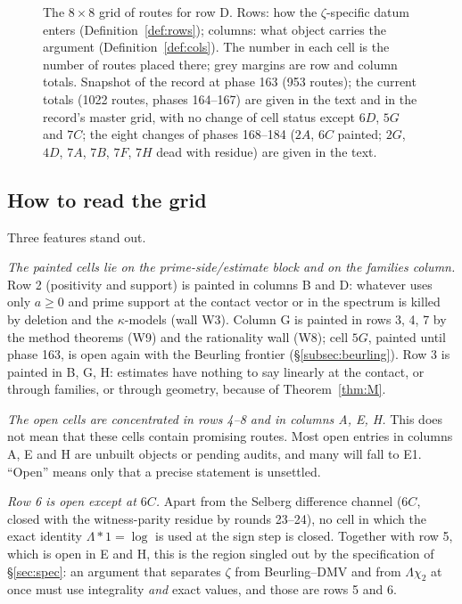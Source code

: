 \documentclass[11pt]{amsart}
\theoremstyle{definition}
\theoremstyle{remark}
\begin{document}
\begin{figure}[ht]
\begin{tikzpicture}[x=1.45cm,y=1.05cm,font=\small]
\end{tikzpicture}
\caption{The $8\times8$ grid of routes for row D. Rows: how the $\zeta$-specific datum enters
(Definition~\ref{def:rows}); columns: what object carries the argument (Definition~\ref{def:cols}).
The number in each cell is the number of routes placed there; grey margins are row and column totals. Snapshot of the record at phase 163 (953 routes); the current totals (1022 routes, phases 164--167) are given in the text and in the record's master grid, with no change of cell status except $6D$, $5G$ and $7C$; the eight changes of phases 168--184 ($2A$, $6C$ painted; $2G$, $4D$, $7A$, $7B$, $7F$, $7H$ dead with residue) are given in the text.}
\label{fig:grid}
\end{figure}

\subsection{How to read the grid}
Three features stand out.

\emph{The painted cells lie on the prime-side/estimate block and on the families column.} Row 2 (positivity
and support) is painted in columns B and D: whatever uses only $a\ge0$ and prime support at the contact
vector or in the spectrum is killed by deletion and the $\kappa$-models (wall W3). Column G is painted in
rows 3, 4, 7 by the method theorems (W9) and the rationality wall (W8); cell $5G$, painted until phase 163, is open again with the Beurling frontier (\S\ref{subsec:beurling}). Row 3 is painted in B, G, H:
estimates have nothing to say linearly at the contact, or through families, or through geometry,
because of Theorem~\ref{thm:M}.

\emph{The open cells are concentrated in rows 4--8 and in columns A, E, H.} This does not mean that these
cells contain promising routes. Most open entries in columns A, E and H are unbuilt objects or pending
audits, and many will fall to E1. ``Open'' means only that a precise statement is unsettled.

\emph{Row 6 is open except at $6C$.} Apart from the Selberg difference channel ($6C$, closed with the
witness-parity residue by rounds 23--24), no cell in which the exact identity $\Lambda*1=\log$ is used at
the sign step is closed. Together with row 5, which is open in E and H, this is the region singled out by the
specification of \S\ref{sec:spec}: an argument that separates $\zeta$ from Beurling--DMV and from $\Lambda\chi_2$
at once must use integrality \emph{and} exact values, and those are rows 5 and 6.
\end{document}
